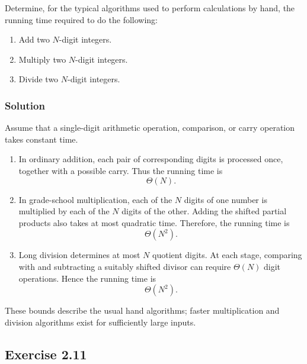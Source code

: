\documentclass[12pt,a4paper]{article}
\begin{document}
\noindent
Determine, for the typical algorithms used to perform calculations by
hand, the running time required to do the following:

\begin{enumerate}
  \renewcommand{\labelenumi}{\alph{enumi}.}
  \item Add two $N$-digit integers.
  \item Multiply two $N$-digit integers.
  \item Divide two $N$-digit integers.
\end{enumerate}

\subsubsection*{\color{sectionnavy}Solution}

Assume that a single-digit arithmetic operation, comparison, or carry
operation takes constant time.

\begin{enumerate}
  \renewcommand{\labelenumi}{\alph{enumi}.}

  \item In ordinary addition, each pair of corresponding digits is
  processed once, together with a possible carry. Thus the running time
  is
  \[
  \boxed{\Theta(N)}.
  \]

  \item In grade-school multiplication, each of the $N$ digits of one
  number is multiplied by each of the $N$ digits of the other. Adding
  the shifted partial products also takes at most quadratic time.
  Therefore, the running time is
  \[
  \boxed{\Theta(N^2)}.
  \]

  \item Long division determines at most $N$ quotient digits. At each
  stage, comparing with and subtracting a suitably shifted divisor can
  require $\Theta(N)$ digit operations. Hence the running time is
  \[
  \boxed{\Theta(N^2)}.
  \]
\end{enumerate}

These bounds describe the usual hand algorithms; faster multiplication
and division algorithms exist for sufficiently large inputs.

\subsection*{\color{sectionnavy}Exercise 2.11}
\end{document}
